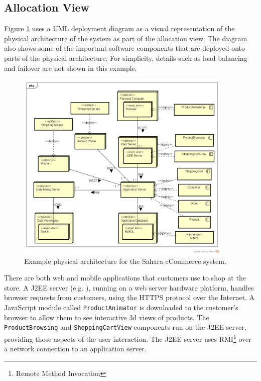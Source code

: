 \subsection{Allocation View}\label{sec:storeAllocView}
Figure \ref{fig:deploymentDiagram} uses a UML deployment diagram as a visual representation of the physical architecture of the system as part of the allocation view.
The diagram also shows some of the important software components that are deployed onto parts of the physical architecture.
For simplicity, details such as load balancing and failover are not shown in this example.

\begin{figure}[h!]
    \centering
    \includegraphics[trim=38 38 23 44,clip,width=0.92\textwidth]{images/uml/deployment_diagram.png}
    \caption{Example physical architecture for the Sahara eCommerce system.}
    \label{fig:deploymentDiagram}
\end{figure}

There are both web and mobile applications that customers use to shop at the store.
A J2EE server (e.g. ), running on a web server hardware platform,
handles browser requests from customers, using the HTTPS protocol over the Internet.
A JavaScript module called \texttt{ProductAnimator} is downloaded to the customer's browser to allow them to see interactive 3d views of products.
The \texttt{ProductBrowsing} and \texttt{ShoppingCartView} components run on the J2EE server, providing those aspects of the user interaction.
The J2EE server uses RMI\footnote{Remote Method Invocation} over a network connection to an application server.

